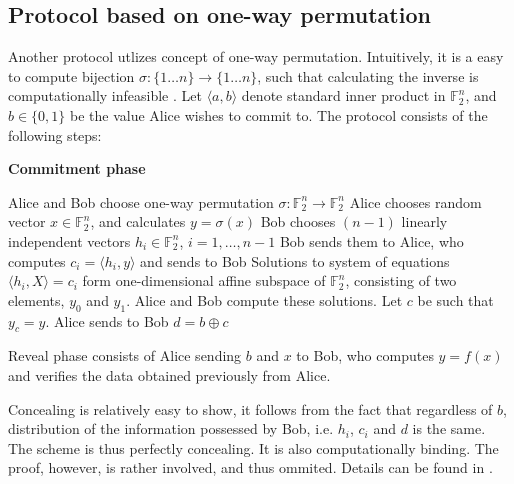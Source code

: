 \documentclass[10pt]{article}
\begin{document}

\subsection{Protocol based on one-way permutation} 

Another protocol utlizes concept of one-way permutation. Intuitively, it is a easy to compute
bijection \(\sigma\colon \{1\ldots n\}\rightarrow \{1\ldots n\}\), such that calculating the
inverse is computationally infeasible \footnotemark. Let \(\langle a,b\rangle\) denote standard
inner product in \(\mathbb{F}_2^n\), and \(b\in\{0,1\}\) be the value Alice wishes to commit to.
The protocol consists of the following steps:


\vspace{2mm}

\NoCaptionOfAlgo
\begin{algorithm}[H]
\caption{\textbf{Commitment phase}}
  Alice and Bob choose one-way permutation \(\sigma\colon \mathbb{F}_2^n\rightarrow 
    \mathbb{F}_2^n\) \;
  Alice chooses random vector \(x\in\mathbb{F}_2^n\), and calculates \(y=\sigma(x)\) \;
  Bob chooses \((n-1)\) linearly independent vectors \(h_i\in\mathbb{F}_2^n\), 
    \(i=1,\ldots, n-1\) \;
  Bob sends them to Alice, who computes \(c_i=\langle h_i, y\rangle\) and sends to Bob \;
  Solutions to system of equations \(\langle h_i, X\rangle = c_i\) form one-dimensional
    affine subspace of \(\mathbb{F}_2^n\), consisting of two elements, \(y_0\) and \(y_1\). Alice
    and Bob compute these solutions.\footnotemark \;
  Let \(c\) be such that \(y_c = y\). Alice sends to Bob \(d=b\oplus c\) \;
\end{algorithm}

\vspace{2mm}


Reveal phase consists of Alice sending \(b\) and \(x\) to Bob, who computes \(y=f(x)\) and verifies
the data obtained previously from Alice.

Concealing is relatively easy to show, it follows from the fact that regardless of \(b\), distribution
of the information possessed by Bob, i.e. \(h_i\), \(c_i\) and \(d\) is the same. The scheme is thus
perfectly concealing. It is also computationally binding. The proof, however, is rather involved, and 
thus ommited. Details can be found in \cite{Naor98}.
\end{document}
